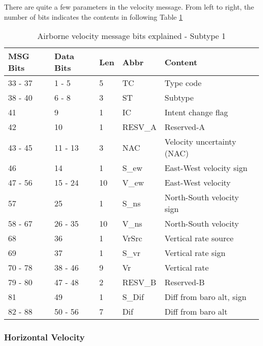 There are quite a few parameters in the velocity message. From left to
right, the number of bits indicates the contents in following Table \ref{tb:adsb-v-bits-st-1}

\begin{table}[!ht]
\centering
\caption{Airborne velocity message bits explained - Subtype 1}
\label{tb:adsb-v-bits-st-1}
\begin{tabular}{@{}lllll@{}}
\toprule
MSG Bits & Data Bits & Len & Abbr    & Content                    \\ \midrule
33 - 37  & 1 - 5     & 5   & TC      & Type code                  \\
38 - 40  & 6 - 8     & 3   & ST      & Subtype                    \\
41       & 9         & 1   & IC      & Intent change flag         \\
42       & 10        & 1   & RESV\_A & Reserved-A                 \\
43 - 45  & 11 - 13   & 3   & NAC     & Velocity uncertainty (NAC) \\
46       & 14        & 1   & S\_ew   & East-West velocity sign    \\
47 - 56  & 15 - 24   & 10  & V\_ew   & East-West velocity         \\
57       & 25        & 1   & S\_ns   & North-South velocity sign  \\
58 - 67  & 26 - 35   & 10  & V\_ns   & North-South velocity       \\
68       & 36        & 1   & VrSrc   & Vertical rate source       \\
69       & 37        & 1   & S\_vr   & Vertical rate sign         \\
70 - 78  & 38 - 46   & 9   & Vr      & Vertical rate              \\
79 - 80  & 47 - 48   & 2   & RESV\_B & Reserved-B                 \\
81       & 49        & 1   & S\_Dif  & Diff from baro alt, sign   \\
82 - 88  & 50 - 56   & 7   & Dif     & Diff from baro alt         \\ \bottomrule
\end{tabular}
\end{table}


\subsubsection{Horizontal Velocity}\label{horizontal-velocity}

